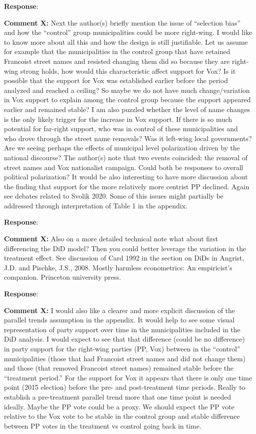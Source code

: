 \documentclass[12pt, a4paper, notitlepage]{article}
\begin{document}
\textbf{Response}: {\color{red}{pending}}

\textbf{Comment X:} Next the author(s) briefly mention the issue of “selection bias” and how the “control” group municipalities could be more right-wing. I would like to know more about all this and how the design is still justifiable.  Let us assume for example that the municipalities in the control group that have retained Francoist street names and resisted changing them did so because they are right-wing strong holds, how would this characteristic affect support for Vox? Is it possible that the support for Vox was established earlier before the period analyzed and reached a ceiling? So maybe we do not have much change/variation in Vox support to explain among the control group because the support appeared earlier and remained stable? I am also puzzled whether the level of name changes is the only likely trigger for the increase in Vox support. If there is so much potential for far-right support, who was in control of these municipalities and who drove through the street name removals? Was it left-wing local governments? Are we seeing perhaps the effects of municipal level polarization driven by the national discourse? The author(s) note that two events coincided: the removal of street names and Vox nationalist campaign.  Could both be responses to overall political polarization? It would be also interesting to have more discussion about the finding that support for the more relatively more centrist PP declined. Again see debates related to Svolik 2020. Some of this issues might partially be addressed through interpretation of Table 1 in the appendix.

\textbf{Response}: {\color{red}{pending}}

\textbf{Comment X:} Also on a more detailed technical note what about first differencing the DiD model? Then you could better leverage the variation in the treatment effect. See discussion of Card 1992 in the section on DiDs in Angrist, J.D. and Pischke, J.S., 2008. Mostly harmless econometrics: An empiricist's companion. Princeton university press.

\textbf{Response}: {\color{red}{pending}}

\textbf{Comment X:} I would also like a clearer and more explicit discussion of the parallel trends assumption in the appendix. It would help to see some visual representation of party support over time in the municipalities included in the DiD analysis. I would expect to see that that difference (could be no difference) in party support for the right-wing parties (PP, Vox) between in the “control” municipalities (those that had Francoist street names and did not change them) and those (that removed Francoist street names) remained stable before the “treatment period.” For the support for Vox it appears that there is only one time point (2015 election) before the pre- and post-treatment time periods. Really to establish a pre-treatment parallel trend more that one time point is needed ideally. Maybe the PP vote could be a proxy. We should expect the PP vote relative to the Vox vote to be stable in the control group and stable difference between PP votes in the treatment vs control going back in time.
\end{document}
